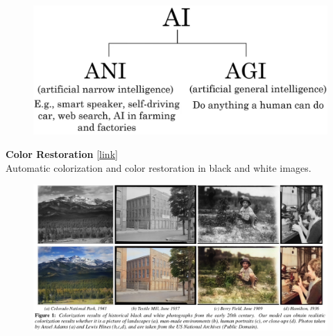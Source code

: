 \documentclass[10pt, compress]{beamer}
\begin{document}
\begin{frame}
  \begin{figure}
    \includegraphics[width=.9\linewidth]{imgs/ai_for_everyone_course/2}
  \end{figure}
\end{frame}

\begin{frame}
  \vspace{.6cm}
  \textbf{Color Restoration} [\href{http://iizuka.cs.tsukuba.ac.jp/projects/colorization/data/colorization_sig2016.pdf}{link}] \\
  \small{Automatic colorization and color restoration in black and white images.} \\
  \vspace{.6cm}
  \begin{figure}
    \includegraphics[width=1\linewidth]{imgs/edx_dl_keras/1}
  \end{figure}
\end{frame}
\end{document}
